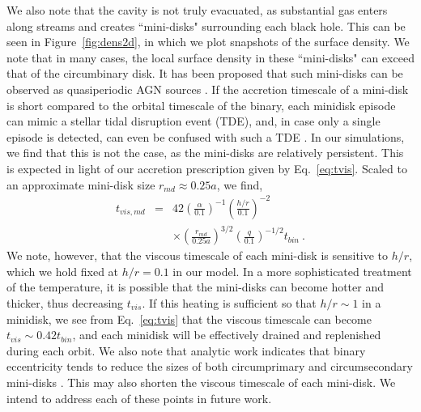 \documentclass[apj]{emulateapj}
\begin{document}
We also note that the cavity is not truly evacuated, as substantial gas enters along streams and creates ``mini-disks" surrounding each black hole.  This can be seen in Figure~\ref{fig:dens2d}, in which we plot snapshots of the surface density. We note that in many cases, the local surface density in these ``mini-disks" can exceed that of the circumbinary disk. It has been proposed that such mini-disks can be observed as quasiperiodic AGN sources \citep{artymowicz96,hayasaki08,hayasaki12}. If the accretion timescale of a mini-disk is short compared to the orbital timescale of the binary, each minidisk episode can mimic a stellar tidal disruption event (TDE), and, in case only a single episode is detected, can even be confused with such a TDE \citep{tanaka13}. In our simulations, we find that this is not the case, as the mini-disks are relatively persistent. This is expected in light of our accretion prescription given by Eq.~\ref{eq:tvis}. Scaled to an approximate mini-disk size $r_{md} \approx 0.25a$, we find,
\begin{eqnarray}
\label{eq:tvis_md}
t_{vis,md} &=& 42 \left(\frac{\alpha}{0.1}\right)^{-1}
\left(\frac{h/r}{0.1}\right)^{-2}\nonumber\\
&& \times
\left(\frac{r_{md}}{0.25a}\right)^{3/2}
\left(\frac{q}{0.1}\right)^{-1/2}
t_{bin} \ .
\end{eqnarray}
We note, however, that the viscous timescale of each mini-disk is sensitive to $h/r$, which we hold fixed at $h/r=0.1$ in our model. In a more sophisticated treatment of the temperature, it is possible that the mini-disks can become hotter and thicker, thus decreasing $t_{vis}$. If this heating is sufficient so that $h/r \sim 1$ in a minidisk, we see from Eq.~\ref{eq:tvis} that the viscous timescale can become $t_{vis} \sim 0.42 t_{bin}$, and each minidisk will be effectively drained and replenished during each orbit. We also note that analytic work indicates that binary eccentricity tends to reduce the sizes of both circumprimary and circumsecondary mini-disks \citep{artymowicz94}. This may also shorten the viscous timescale of each mini-disk. We intend to address each of these points in future work.
\end{document}
